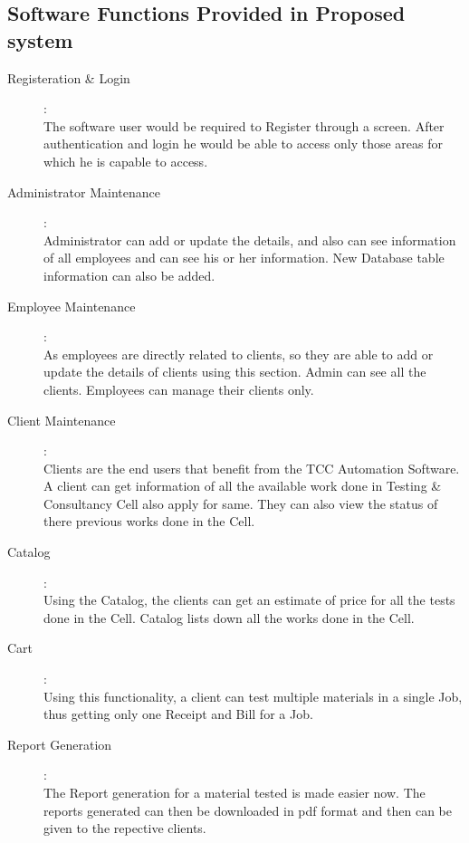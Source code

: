 \subsection{Software Functions Provided in Proposed system}
\vskip 0.5cm
\begin{description}
\item[Registeration \& Login] :\\
The software user would be required to Register through a screen. After authentication and login he would be able to access only those areas for which he is capable to access.
\item[Administrator Maintenance] :\\
Administrator can add or update the details, and also can see information of all employees and can see his or her information. New Database table information can also be added.
\item[Employee Maintenance] :\\
As employees are directly related to clients, so they are able to add or update the details of clients using this section. Admin can see all the clients. Employees can manage their clients only.
\item[Client Maintenance] :\\
Clients are the end users that benefit from the TCC Automation Software. A client can get information of all the available work done in Testing & Consultancy Cell also apply for same. They can also view the status of there previous works done in the Cell.
\item[Catalog] :\\
Using the Catalog, the clients can get an estimate of price for all the tests done in the Cell. Catalog lists down all the works done in the Cell.
\item[Cart] :\\
Using this functionality, a client can test multiple materials in a single Job, thus getting only one Receipt and Bill for a Job.
\item[Report Generation] :\\
The Report generation for a material tested is made easier now. The reports generated can then be downloaded in pdf format and then can be given to the repective clients.
\end{description}




